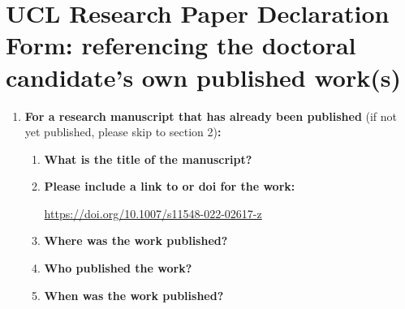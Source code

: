 %
%
% 
{\sffamily
\section*{UCL Research Paper Declaration Form: referencing the doctoral candidate’s own published work(s)}
%
%

\begin{enumerate}[leftmargin=*,label={\bfseries\arabic*.}]\itemsep0em
	\item \textbf{For a research manuscript that has already been published} (if not yet published, please skip to section 2)\textbf{:}
	\begin{enumerate}[label={\alph*)}]\itemsep0em
	\item \textbf{What is the title of the manuscript?}


	\item \textbf{Please include a link to or doi for the work:}

	\url{https://doi.org/10.1007/s11548-022-02617-z}

	\item \textbf{Where was the work published?}


	\item \textbf{Who published the work?}


	\item \textbf{When was the work published?}


\end{enumerate}
\end{enumerate}}
